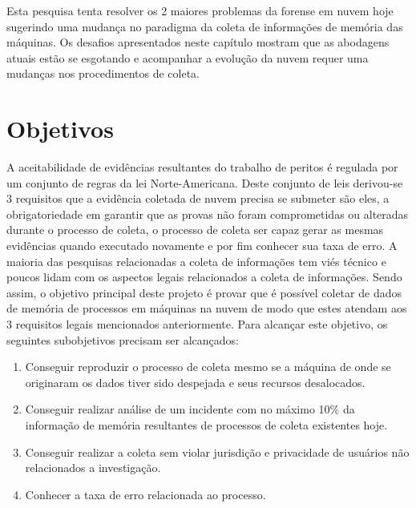 \documentclass[12pt,				%
	openright,			%
	oneside,			%
	a4paper,			%
	english,			%
	brazil				%
	]{abntex2}
\begin{document}
Esta pesquisa tenta resolver os 2 maiores problemas da forense em nuvem hoje sugerindo uma mudança no paradigma da coleta de informações de memória das máquinas. Os desafios apresentados
neste capítulo mostram que as abodagens atuais estão se esgotando e acompanhar a evolução da nuvem requer uma mudanças nos procedimentos de coleta.

\chapter{Objetivos} \label{chap:obj}
A aceitabilidade de evidências resultantes do trabalho de peritos é regulada por um conjunto de regras da lei Norte-Americana. Deste conjunto de leis derivou-se 3 requisitos que
a evidência coletada de nuvem precisa se submeter são eles, a obrigatoriedade em garantir que as provas não foram comprometidas ou alteradas durante o processo de coleta, o processo
de coleta ser capaz gerar as mesmas evidências quando executado novamente e por fim conhecer sua taxa de erro. A maioria das pesquisas relacionadas a coleta de informações tem viés
técnico e poucos lidam com os aspectos legais relacionados a coleta de informações. Sendo assim, o objetivo principal deste projeto é provar que é possível coletar de dados de 
memória de processos em máquinas na nuvem de modo que estes atendam aos 3 requisitos legais mencionados anteriormente. Para alcançar este objetivo, os seguintes subobjetivos 
precisam ser alcançados:

\begin{enumerate}
 \item Conseguir reproduzir o processo de coleta mesmo se a máquina de onde se originaram os dados tiver sido despejada e seus recursos desalocados.
 \item Conseguir realizar análise de um incidente com no máximo 10\% da informação de memória resultantes de processos de coleta existentes hoje.
 \item Conseguir realizar a coleta sem violar jurisdição e privacidade de usuários não relacionados a investigação.
 \item Conhecer a taxa de erro relacionada ao processo.
\end{enumerate}
\end{document}
